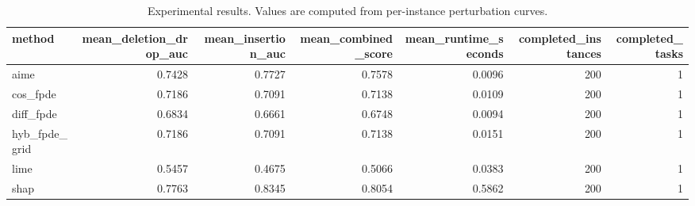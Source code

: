 \begin{table}[t]
\caption{Experimental results. Values are computed from per-instance perturbation curves.}
\label{tab:main_results_computed}
\centering
\begin{tabular}{lrrrrrr}
\toprule
method & mean\_deletion\_drop\_auc & mean\_insertion\_auc & mean\_combined\_score & mean\_runtime\_seconds & completed\_instances & completed\_tasks \\
\midrule
aime & 0.7428 & 0.7727 & 0.7578 & 0.0096 & 200 & 1 \\
cos\_fpde & 0.7186 & 0.7091 & 0.7138 & 0.0109 & 200 & 1 \\
diff\_fpde & 0.6834 & 0.6661 & 0.6748 & 0.0094 & 200 & 1 \\
hyb\_fpde\_grid & 0.7186 & 0.7091 & 0.7138 & 0.0151 & 200 & 1 \\
lime & 0.5457 & 0.4675 & 0.5066 & 0.0383 & 200 & 1 \\
shap & 0.7763 & 0.8345 & 0.8054 & 0.5862 & 200 & 1 \\
\bottomrule
\end{tabular}

\end{table}
